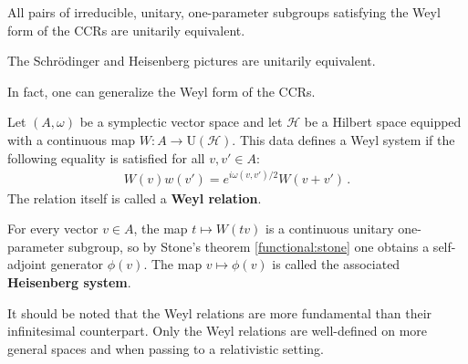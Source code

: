     \begin{theorem}\label{qm_formalism:stone_von_neumann}
        All pairs of irreducible, unitary, one-parameter subgroups satisfying the Weyl form of the CCRs are unitarily equivalent.
    \end{theorem}
    \begin{result}
        The Schr\"odinger and Heisenberg pictures are unitarily equivalent.
    \end{result}

    In fact, one can generalize the Weyl form of the CCRs.
    \begin{definition}
        Let $(A,\omega)$ be a symplectic vector space and let $\mathcal{H}$ be a Hilbert space equipped with a continuous map $W:A\rightarrow\mathrm{U}(\mathcal{H})$. This data defines a Weyl system if the following equality is satisfied for all $v,v'\in A$:
        \begin{gather}
            W(v)w(v')=e^{i\omega(v,v')/2}W(v+v')\,.
        \end{gather}
        The relation itself is called a \textbf{Weyl relation}.

        For every vector $v\in A$, the map $t\mapsto W(tv)$ is a continuous unitary one-parameter subgroup, so by Stone's theorem \ref{functional:stone} one obtains a self-adjoint generator $\phi(v)$. The map $v\mapsto\phi(v)$ is called the associated \textbf{Heisenberg system}.
    \end{definition}
    \begin{remark}
        It should be noted that the Weyl relations are more fundamental than their infinitesimal counterpart. Only the Weyl relations are well-defined on more general spaces and when passing to a relativistic setting.
    \end{remark}

